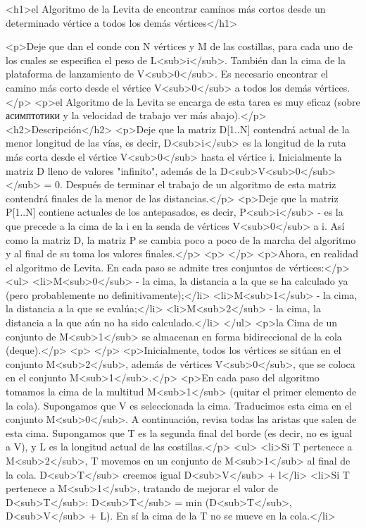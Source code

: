 <h1>el Algoritmo de la Levita de encontrar caminos más cortos desde un determinado vértice a todos los demás vértices</h1>

<p>Deje que dan el conde con N vértices y M de las costillas, para cada uno de los cuales se especifica el peso de L<sub>i</sub>. También dan la cima de la plataforma de lanzamiento de V<sub>0</sub>. Es necesario encontrar el camino más corto desde el vértice V<sub>0</sub> a todos los demás vértices.</p>
<p>el Algoritmo de la Levita se encarga de esta tarea es muy eficaz (sobre асимптотики y la velocidad de trabajo ver más abajo).</p>
<h2>Descripción</h2>
<p>Deje que la matriz D[1..N] contendrá actual de la menor longitud de las vías, es decir, D<sub>i</sub> es la longitud de la ruta más corta desde el vértice V<sub>0</sub> hasta el vértice i. Inicialmente la matriz D lleno de valores "infinito", además de la D<sub>V<sub>0</sub></sub> = 0. Después de terminar el trabajo de un algoritmo de esta matriz contendrá finales de la menor de las distancias.</p>
<p>Deje que la matriz P[1..N] contiene actuales de los antepasados, es decir, P<sub>i</sub> - es la que precede a la cima de la i en la senda de vértices V<sub>0</sub> a i. Así como la matriz D, la matriz P se cambia poco a poco de la marcha del algoritmo y al final de su toma los valores finales.</p>
<p> </p>
<p>Ahora, en realidad el algoritmo de Levita. En cada paso se admite tres conjuntos de vértices:</p>
<ul>
<li>M<sub>0</sub> - la cima, la distancia a la que se ha calculado ya (pero probablemente no definitivamente);</li>
<li>M<sub>1</sub> - la cima, la distancia a la que se evalúa;</li>
<li>M<sub>2</sub> - la cima, la distancia a la que aún no ha sido calculado.</li>
</ul>
<p>la Cima de un conjunto de M<sub>1</sub> se almacenan en forma bidireccional de la cola (deque).</p>
<p> </p>
<p>Inicialmente, todos los vértices se sitúan en el conjunto M<sub>2</sub>, además de vértices V<sub>0</sub>, que se coloca en el conjunto M<sub>1</sub>.</p>
<p>En cada paso del algoritmo tomamos la cima de la multitud M<sub>1</sub> (quitar el primer elemento de la cola). Supongamos que V es seleccionada la cima. Traducimos esta cima en el conjunto M<sub>0</sub>. A continuación, revisa todas las aristas que salen de esta cima. Supongamos que T es la segunda final del borde (es decir, no es igual a V), y L es la longitud actual de las costillas.</p>
<ul>
<li>Si T pertenece a M<sub>2</sub>, T movemos en un conjunto de M<sub>1</sub> al final de la cola. D<sub>T</sub> creemos igual D<sub>V</sub> + l</li>
<li>Si T pertenece a M<sub>1</sub>, tratando de mejorar el valor de D<sub>T</sub>: D<sub>T</sub> = min (D<sub>T</sub>, D<sub>V</sub> + L). En sí la cima de la T no se mueve en la cola.</li>
